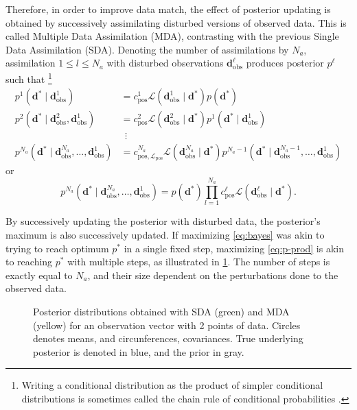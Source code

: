 Therefore, in order to improve data match, the effect of posterior updating is obtained 
by successively assimilating disturbed versions of observed data.
%
This is called Multiple Data Assimilation (MDA), contrasting with the previous Single Data Assimilation (SDA).
%
Denoting the number of assimilations by $N_a$,
assimilation $1\leq l\leq N_a$ with disturbed observations $\mathbf{d}^\ell_\text{obs}$
produces posterior $p^\ell$ such that%
\footnote{%
    Writing a conditional distribution as the product of simpler conditional distributions 
    is sometimes called  the chain rule of conditional probabilities
    \cite[subsection C.1.8]{Emerick:2025}.
}
%
\begin{align}
    p^1(\mathbf{d}^*\mid \mathbf{d}^1_\text{obs}) 
    &= c^1_\text{pos} \mathcal{L}(\mathbf{d}^1_\text{obs}\mid \mathbf{d}^*) 
                        p(\mathbf{d}^*) 
\label{eq:p1}
    \\
    p^2(\mathbf{d}^*\mid \mathbf{d}^2_\text{obs}, \mathbf{d}^1_\text{obs}) 
    &= c^2_\text{pos} \mathcal{L}(\mathbf{d}^2_\text{obs}\mid \mathbf{d}^*) 
                        p^1(\mathbf{d}^*\mid \mathbf{d}^1_\text{obs}) 
\label{eq:p2} 
    \\
    &\ \ \vdots 
    \\
    p^{N_a}(\mathbf{d}^*\mid \mathbf{d}^{N_a}_\text{obs}, \dots, \mathbf{d}^1_\text{obs})
    &= c^{N_a}_{\text{pos},\mathcal{L}_\text{pos}} \mathcal{L}(\mathbf{d}^{N_a}_\text{obs} \mid \mathbf{d}^*)
        p^{N_a-1}(\mathbf{d}^*\mid \mathbf{d}^{N_a-1}_\text{obs}, \dots, \mathbf{d}^1_\text{obs}) 
\label{eq:pNa} 
\end{align}  
%
or
%
\begin{equation}
    p^{N_a}(\mathbf{d}^*\mid \mathbf{d}^{N_a}_\text{obs}, \dots, \mathbf{d}^1_\text{obs})
    =
    p(\mathbf{d}^*) \prod_{l=1}^{N_a} c^\ell_\text{pos} \mathcal{L}(\mathbf{d}^\ell_\text{obs} \mid \mathbf{d}^*). 
\label{eq:p-prod}
\end{equation}  

By successively updating the posterior with disturbed data, the posterior's maximum is also successively updated.
If maximizing \cref{eq:bayes} was akin to trying to reach optimum $p^*$ in a single fixed step,
maximizing \cref{eq:p-prod} is akin to reaching $p^*$ with multiple steps, 
as illustrated in \cref{fig:sda-versus-mda}.
The number of steps is exactly equal to $N_a$, and their size dependent on the perturbations done to the observed data. 
%
\begin{figure}[htbp]
    \centering 
    \caption{%
        Posterior distributions obtained with SDA (green) and MDA (yellow) 
        for an observation vector with 2 points of data.
        Circles denotes means, and circunferences, covariances.
        True underlying posterior is denoted in blue, and the prior in gray. 
    }
    \label{fig:sda-versus-mda}
    
\end{figure}

